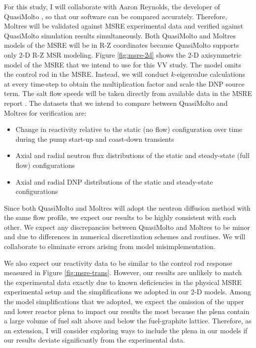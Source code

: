 For this study, I will collaborate with Aaron Reynolds, the developer of QuasiMolto
\cite{reynolds_analysis_2023},
so that our software can be compared accurately. Therefore, Moltres
will be validated against \gls{MSRE} experimental data and verified against QuasiMolto simulation
results simultaneously. Both QuasiMolto and Moltres models of the \gls{MSRE} will be in R-Z
coordinates because QuasiMolto supports only 2-D R-Z \gls{MSR} modeling. Figure \ref{fig:msre-2d}
shows the 2-D axisymmetric model of the \gls{MSRE} that we intend to use
for this \gls{VV} study. The model omits the control rod in the \gls{MSRE}. Instead, we will
conduct $k$-eigenvalue calculations at every time-step to obtain the multiplication factor and
scale the \gls{DNP} source term. The salt flow speeds will be taken directly from available data in
the \gls{MSRE} report \cite{prince_zero-power_1968}. The datasets that we intend to compare between
QuasiMolto and Moltres for verification are:
%
\begin{itemize}
  \item Change in reactivity relative to the static (no flow) configuration over time during the
    pump start-up and coast-down transients
  \item Axial and radial neutron flux distributions of the static and steady-state (full flow)
    configurations
  \item Axial and radial \gls{DNP} distributions of the static and steady-state configurations
\end{itemize}

Since both QuasiMolto and Moltres will adopt the neutron diffusion method with the same flow
profile, we expect our results to be highly consistent with each other. We expect any discrepancies
between QuasiMolto and Moltres to be minor and due to differences in numerical discretization
schemes and routines. We will collaborate to eliminate errors arising from model misimplementation.

We also expect our reactivity data to be similar to the control rod response measured in Figure
\ref{fig:msre-trans}. However, our results are unlikely to match the experimental data exactly due
to known deficiencies in the physical \gls{MSRE} experimental setup and the simplifications we
adopted in our 2-D models. Among the model simplifications that we adopted, we expect the omission
of the upper and lower reactor plena to impact our results the most because the plena contain a
large volume of fuel salt above and below the fuel-graphite lattice. Therefore, as an extension, I
will consider exploring ways to include the plena in our models if our results deviate
significantly from the experimental data.

